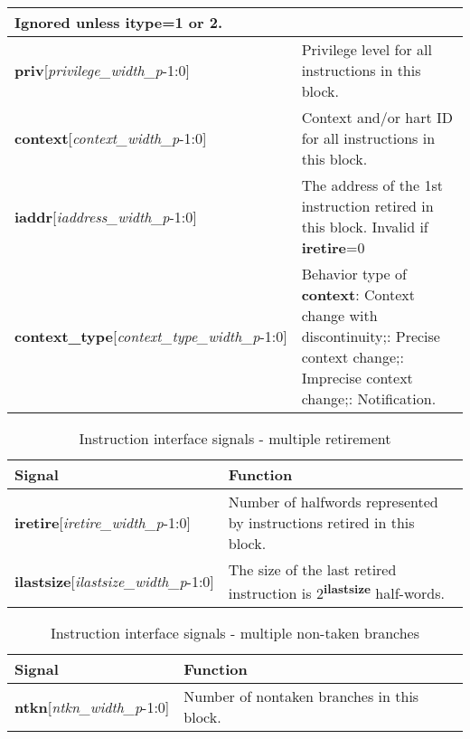\begin{table}[htp]
\begin{tabulary}{\textwidth}{|l|p{80mm}|}
    Ignored unless \textbf{itype}=1 or 2.\\
        \hline
        \textbf{priv}[\textit{privilege\_width\_p}-1:0] & Privilege level for all instructions in this block.\\
        \hline
        \textbf{context}[\textit{context\_width\_p}-1:0] & Context and/or hart ID for all instructions in this block.\\
        \hline
        \textbf{iaddr}[\textit{iaddress\_width\_p}-1:0] & The address of the 1st instruction retired in this block.\newline
        Invalid if \textbf{iretire}=0 \\
        \hline
        \textbf{context\_type}[\textit{context\_type\_width\_p}-1:0] & Behavior type of \textbf{context}: Context change with discontinuity;: Precise context change;: Imprecise context change;: Notification.\\
        \hline
    \end{tabulary}
\end{table}

\begin{table}[htp]
    \centering
    \caption{Instruction interface signals - multiple retirement}
    \label{tab:multi-ingress}
    \begin{tabulary}{\textwidth}{|l|p{80mm}|}
        \hline
        \textbf {Signal} & \textbf {Function} \\
        \hline
        \textbf{iretire}[\textit{iretire\_width\_p}-1:0] & Number of halfwords represented by instructions retired in this block.\\
        \hline
        \textbf{ilastsize}[\textit{ilastsize\_width\_p}-1:0] & The size of the last retired instruction is 2\textsuperscript{\textbf{ilastsize}} half-words.\\
        \hline
    \end{tabulary}
\end{table}

\begin{table}[htp]
    \centering
    \caption{Instruction interface signals - multiple non-taken branches}
    \label{tab:multintb-ingress}
    \begin{tabulary}{\textwidth}{|l|p{90mm}|}
        \hline
        \textbf {Signal} & \textbf {Function} \\
        \hline
        \textbf{ntkn}[\textit{ntkn\_width\_p}-1:0] & Number of nontaken branches in this block.\\
        \hline
    \end{tabulary}
\end{table}

